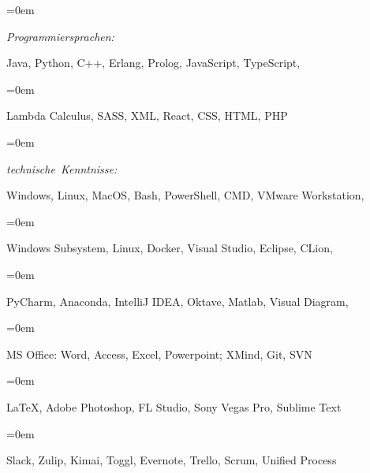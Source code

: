\documentclass[paper=a4,fontsize=10.47pt]{scrartcl} %
\newlength{\spacebox}
\newcommand{\sepspace}{\vspace*{0.5em}}		%
\newcommand{\PersonalEntry}[2]{
		\noindent\hangindent=0em\hangafter=0 %
		\parbox{\spacebox}{        %
		\mbox {\textit{#1}}}		       %
		\hspace{5em} #2 \par}    %
\newcommand{\SkillsEntry}[2]{      %
		\noindent\hangindent=0em\hangafter=0 %
		\parbox{\spacebox}{        %
		\mbox{\textit{#1}}}			   %
		\hspace{6em} #2 \par}    %
\begin{document}
\sepspace

\SkillsEntry{Programmiersprachen:}{Java, Python, C++, Erlang, Prolog, JavaScript, TypeScript,}
\SkillsEntry{}{Lambda Calculus, SASS, XML, React, CSS, HTML, PHP}

\sepspace

\SkillsEntry{technische Kenntnisse:}{Windows, Linux, MacOS, Bash, PowerShell, CMD, VMware Workstation, } 
\SkillsEntry{}{Windows Subsystem, Linux, Docker, Visual Studio, Eclipse, CLion,}
\SkillsEntry{}{PyCharm, Anaconda, IntelliJ IDEA, Oktave, Matlab, Visual Diagram,}
\SkillsEntry{}{MS Office: Word, Access, Excel, Powerpoint; XMind, Git, SVN}
\SkillsEntry{}{\LaTeX, Adobe Photoshop, FL Studio, Sony Vegas Pro, Sublime Text}
\SkillsEntry{}{Slack, Zulip, Kimai, Toggl, Evernote, Trello, Scrum, Unified Process}
\end{document}
